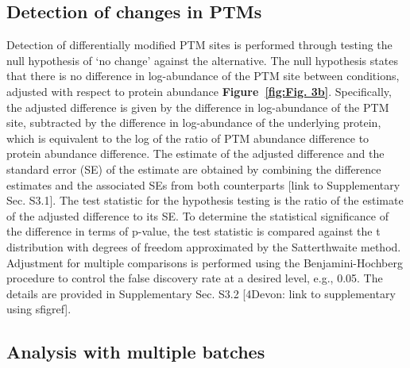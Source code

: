 \documentclass[mcp]{article}
\numberwithin{figure}{section} %
\numberwithin{table}{section}
\def\todo#1{{\color{red}[#1]}}
\def\devon#1{{\color{green}[4Devon: #1]}}
\def\figref#1{{\bf Figure~\ref{fig:#1}}}
\begin{document}
\subsection*{Detection of changes in PTMs}

Detection of differentially modified PTM sites is performed through testing the null hypothesis of ‘no change’ against the alternative. The null hypothesis states that there is no difference in log-abundance of the PTM site between conditions, adjusted with respect to protein abundance \figref{Fig. 3b}. Specifically, the adjusted difference is given by the difference in log-abundance of the PTM site, subtracted by the difference in log-abundance of the underlying protein, which is equivalent to the log of the ratio of PTM abundance difference to protein abundance difference. The estimate of the adjusted difference and the standard error (SE) of the estimate are obtained by combining the difference estimates and the associated SEs from both counterparts \todo{link to Supplementary Sec. S3.1}. The test statistic for the hypothesis testing is the ratio of the estimate of the adjusted difference to its SE. To determine the statistical significance of the difference in terms of p-value, the test statistic is compared against the t distribution with degrees of freedom approximated by the Satterthwaite method. \cite{satterthwaite:1946} Adjustment for multiple comparisons is performed using the Benjamini-Hochberg procedure to control the false discovery rate at a desired level, e.g., 0.05.\cite{Benjamini:1995} The details are provided in Supplementary Sec. S3.2 \devon{link to supplementary using sfigref}.

\subsection*{Analysis with multiple batches}
\end{document}
